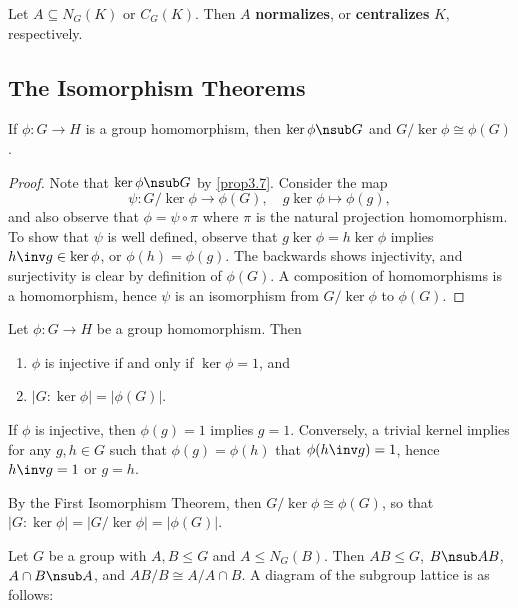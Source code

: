  Let $A \subseteq N_G(K)$ or $C_G(K)$. Then $A$ \textbf{normalizes}, or \textbf{centralizes} $K$, respectively.

\newpage

\subsection{The Isomorphism Theorems} \label{sec3.3}

 \label{theo3.16}
If $\phi : G \to H$ is a group homomorphism, then $\ker\phi \nsub G$ and $G/\ker\phi \cong \phi(G)$.
\begin{proof}
    Note that $\ker\phi \nsub G$ by \autoref{prop3.7}. Consider the map
    \[\psi : G/\ker\phi \to \phi(G), \quad g\ker\phi \mapsto \phi(g),\]
    and also observe that $\phi = \psi \circ \pi$ where $\pi$ is the natural projection homomorphism. To show that $\psi$ is well defined, observe that $g\ker\phi = h\ker\phi$ implies $h\inv g \in \ker\phi$, or $\phi(h) = \phi(g)$. The backwards shows injectivity, and surjectivity is clear by definition of $\phi(G)$. A composition of homomorphisms is a homomorphism, hence $\psi$ is an isomorphism from $G/\ker\phi$ to $\phi(G)$.
\end{proof}

 \label{cor3.17}
Let $\phi : G \to H$ be a group homomorphism. Then
\begin{enumerate}
    \item $\phi$ is injective if and only if $\ker\phi = 1$, and
    \item $|G : \ker\phi| = |\phi(G)|$.
\end{enumerate}

\begin{proofnum}
    \item If $\phi$ is injective, then $\phi(g) = 1$ implies $g = 1$. Conversely, a trivial kernel implies for any $g, h \in G$ such that $\phi(g) = \phi(h)$ that $\phi(h\inv g) = 1$, hence $h\inv g = 1$ or $g = h$.
    \item By the First Isomorphism Theorem, then $G/\ker\phi \cong \phi(G)$, so that $|G : \ker\phi| = |G/\ker\phi| = |\phi(G)|$.
\end{proofnum}

 \label{theo3.18}
Let $G$ be a group with $A, B \leq G$ and $A \leq N_G(B)$. Then $AB \leq G$, $B \nsub AB$, $A \cap B \nsub A$, and $AB/B \cong A/A \cap B$. A diagram of the subgroup lattice is as follows:
\begin{center}
\end{center}

